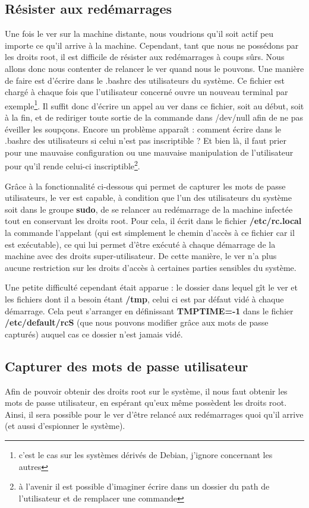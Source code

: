 \documentclass[]{projet-M1}
\begin{document}
\subsection{Résister aux redémarrages}
Une fois le ver sur la machine distante, nous voudrions qu'il soit actif peu importe ce qu'il arrive à la machine. Cependant, tant que nous ne possédons par les droits root, il est difficile de résister aux redémarrages à coups sûrs. Nous allons donc nous contenter de relancer le ver quand nous le pouvons. 
Une manière de faire est d'écrire dans le .bashrc des utilisateurs du système. Ce fichier est chargé à chaque fois que l'utilisateur concerné ouvre un nouveau terminal par exemple\footnote{c'est le cas sur les systèmes dérivés de Debian, j'ignore concernant les autres}. Il suffit donc d'écrire un appel au ver dans ce fichier, soit au début, soit à la fin, et de rediriger toute sortie de la commande dans /dev/null afin de ne pas éveiller les soupçons. Encore un problème apparaît : comment écrire dans le .bashrc des utilisateurs si celui n'est pas inscriptible ? Et bien là, il faut prier pour une mauvaise configuration ou une mauvaise manipulation de l'utilisateur pour qu'il rende celui-ci inscriptible\footnote{à l'avenir il est possible d'imaginer écrire dans un dossier du \gls{path} de l'utilisateur et de remplacer une commande}.

Grâce à la fonctionnalité ci-dessous qui permet de capturer les mots de passe utilisateurs, le ver est capable, à condition que l'un des utilisateurs du système soit dans le groupe \textbf{sudo}, de se relancer au redémarrage de la machine infectée tout en conservant les droits root. Pour cela, il écrit dans le fichier \textbf{/etc/rc.local} la commande l'appelant (qui est simplement le chemin d'accès à ce fichier car il est exécutable), ce qui lui permet d'être exécuté à chaque démarrage de la machine avec des droits super-utilisateur. De cette manière, le ver n'a plus aucune restriction sur les droits d'accès à certaines parties sensibles du système.

Une petite difficulté cependant était apparue : le dossier dans lequel gît le ver et les fichiers dont il a besoin étant \textbf{/tmp}, celui ci est par défaut vidé à chaque démarrage. Cela peut s'arranger en définissant \textbf{TMPTIME=-1} dans le fichier \textbf{/etc/default/rcS} (que nous pouvons modifier grâce aux mots de passe capturés) auquel cas ce dossier n'est jamais vidé.

\subsection{Capturer des mots de passe utilisateur}
Afin de pouvoir obtenir des droits root sur le système, il nous faut obtenir les mots de passe utilisateur, en espérant qu'eux même possèdent les droits root. Ainsi, il sera possible pour le ver d'être relancé aux redémarrages quoi qu'il arrive (et aussi d'espionner le système). 
\end{document}
